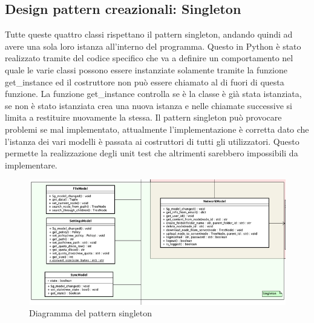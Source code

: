 \subsection{Design pattern creazionali: Singleton}

Tutte queste quattro classi rispettano il pattern singleton, andando quindi ad avere una sola loro istanza all'interno del programma. Questo in Python è stato realizzato tramite del codice specifico che va a definire un comportamento nel quale le varie classi possono essere instanziate solamente tramite la funzione get\_instance ed il costruttore non può essere chiamato al di fuori di questa funzione. La funzione get\_instance controlla se è la classe è già stata istanziata, se non è stato istanziata crea una nuova istanza e nelle chiamate successive si limita a restituire nuovamente la stessa.\newline{}
Il pattern singleton può provocare problemi se mal implementato, attualmente l'implementazione è corretta dato che l'istanza dei vari modelli è passata ai costruttori di tutti gli utilizzatori. Questo permette la realizzazione degli unit test che altrimenti sarebbero impossibili da implementare. 
\begin{figure}[H]
    \centering
    \includegraphics[scale = 0.8]{components/img/singleton-model.png}
    \caption{Diagramma del pattern singleton}
    \label{fig:Diagramma del pattern singleton}
\end{figure}
